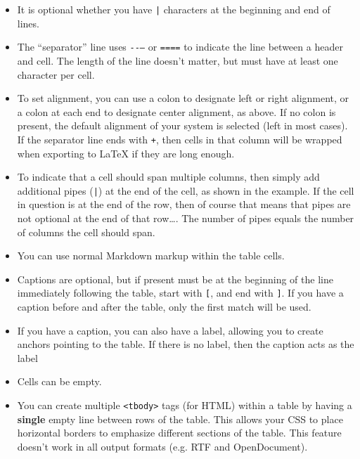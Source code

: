 \begin{itemize}
\item It is optional whether you have \texttt{|} characters at the beginning and end of lines.

\item The ``separator'' line uses \texttt{-{}-{}--} or \texttt{====} to indicate the line between a header and cell. The length of the line doesn't matter, but must have at least one character per cell.

\item To set alignment, you can use a colon to designate left or right alignment, or a colon at each end to designate center alignment, as above. If no colon is present, the default alignment of your system is selected (left in most cases). If the separator line ends with \texttt{+}, then cells in that column will be wrapped when exporting to LaTeX if they are long enough.

\item To indicate that a cell should span multiple columns, then simply add additional pipes (\texttt{|}) at the end of the cell, as shown in the example. If the cell in question is at the end of the row, then of course that means that pipes are not optional at the end of that row{\ldots}. The number of pipes equals the number of columns the cell should span.

\item You can use normal Markdown markup within the table cells.

\item Captions are optional, but if present must be at the beginning of the line immediately following the table, start with \texttt{[}, and end with \texttt{]}. If you have a caption before and after the table, only the first match will be used.

\item If you have a caption, you can also have a label, allowing you to create anchors pointing to the table. If there is no label, then the caption acts as the label

\item Cells can be empty.

\item You can create multiple \texttt{<tbody>} tags (for HTML) within a table by having a \textbf{single} empty line between rows of the table. This allows your CSS to place horizontal borders to emphasize different sections of the table. This feature doesn't work in all output formats (e.g. RTF and OpenDocument).

\end{itemize}

